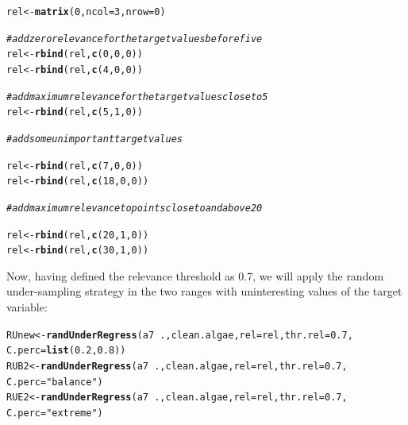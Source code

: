 \documentclass[10pt,a4paper]{article}\usepackage[]{graphicx}\usepackage[]{color}
\makeatletter
\newcommand{\hlnum}[1]{\textcolor[rgb]{0.686,0.059,0.569}{#1}}%
\newcommand{\hlstr}[1]{\textcolor[rgb]{0.192,0.494,0.8}{#1}}%
\newcommand{\hlcom}[1]{\textcolor[rgb]{0.678,0.584,0.686}{\textit{#1}}}%
\newcommand{\hlopt}[1]{\textcolor[rgb]{0,0,0}{#1}}%
\newcommand{\hlstd}[1]{\textcolor[rgb]{0.345,0.345,0.345}{#1}}%
\newcommand{\hlkwb}[1]{\textcolor[rgb]{0.69,0.353,0.396}{#1}}%
\newcommand{\hlkwc}[1]{\textcolor[rgb]{0.333,0.667,0.333}{#1}}%
\newcommand{\hlkwd}[1]{\textcolor[rgb]{0.737,0.353,0.396}{\textbf{#1}}}%
\newenvironment{kframe}{%
 \def\at@end@of@kframe{}%
 \ifinner\ifhmode%
  \def\at@end@of@kframe{\end{minipage}}%
  \begin{minipage}{\columnwidth}%
 \fi\fi%
 \def\FrameCommand##1{\hskip\@totalleftmargin \hskip-\fboxsep
 \colorbox{shadecolor}{##1}\hskip-\fboxsep
     \hskip-\linewidth \hskip-\@totalleftmargin \hskip\columnwidth}%
 \MakeFramed {\advance\hsize-\width
   \@totalleftmargin\z@ \linewidth\hsize
   \@setminipage}}%
 {\par\unskip\endMakeFramed%
 \at@end@of@kframe}
\newenvironment{knitrout}{}{} %
\makeatother
\begin{document}
\begin{knitrout}\footnotesize
{}\color{fgcolor}\begin{kframe}
\begin{alltt}
\hlstd{rel} \hlkwb{<-} \hlkwd{matrix}\hlstd{(}\hlnum{0}\hlstd{,}\hlkwc{ncol}\hlstd{=}\hlnum{3}\hlstd{,}\hlkwc{nrow}\hlstd{=}\hlnum{0}\hlstd{)}

\hlcom{# add zero relevance for the target values before five}
\hlstd{rel} \hlkwb{<-} \hlkwd{rbind}\hlstd{(rel,} \hlkwd{c}\hlstd{(}\hlnum{0}\hlstd{,}\hlnum{0}\hlstd{,}\hlnum{0}\hlstd{))}
\hlstd{rel} \hlkwb{<-} \hlkwd{rbind}\hlstd{(rel,}\hlkwd{c}\hlstd{(}\hlnum{4}\hlstd{,}\hlnum{0}\hlstd{,}\hlnum{0}\hlstd{))}

\hlcom{# add maximum relevance for the target values close to 5}
\hlstd{rel} \hlkwb{<-} \hlkwd{rbind}\hlstd{(rel,} \hlkwd{c}\hlstd{(}\hlnum{5}\hlstd{,}\hlnum{1}\hlstd{,}\hlnum{0}\hlstd{))}

\hlcom{# add some unimportant target values }

\hlstd{rel} \hlkwb{<-} \hlkwd{rbind}\hlstd{(rel,} \hlkwd{c}\hlstd{(}\hlnum{7}\hlstd{,}\hlnum{0}\hlstd{,}\hlnum{0}\hlstd{))}
\hlstd{rel} \hlkwb{<-} \hlkwd{rbind}\hlstd{(rel,} \hlkwd{c}\hlstd{(}\hlnum{18}\hlstd{,}\hlnum{0}\hlstd{,}\hlnum{0}\hlstd{))}

\hlcom{# add maximum relevance to points close to and above 20}

\hlstd{rel} \hlkwb{<-} \hlkwd{rbind}\hlstd{(rel,} \hlkwd{c}\hlstd{(}\hlnum{20}\hlstd{,}\hlnum{1}\hlstd{,}\hlnum{0}\hlstd{))}
\hlstd{rel} \hlkwb{<-} \hlkwd{rbind}\hlstd{(rel,} \hlkwd{c}\hlstd{(}\hlnum{30}\hlstd{,}\hlnum{1}\hlstd{,}\hlnum{0}\hlstd{))}
\end{alltt}
\end{kframe}
\end{knitrout}

Now, having defined the relevance threshold as 0.7, we will apply the random under-sampling strategy in the two ranges with uninteresting values of the target variable:

\begin{knitrout}\footnotesize
{}\color{fgcolor}\begin{kframe}
\begin{alltt}
\hlstd{RUnew} \hlkwb{<-} \hlkwd{randUnderRegress}\hlstd{(a7}\hlopt{~}\hlstd{., clean.algae,} \hlkwc{rel}\hlstd{=rel,} \hlkwc{thr.rel}\hlstd{=}\hlnum{0.7}\hlstd{,}
                          \hlkwc{C.perc}\hlstd{=}\hlkwd{list}\hlstd{(}\hlnum{0.2}\hlstd{,}\hlnum{0.8}\hlstd{))}
\hlstd{RUB2} \hlkwb{<-} \hlkwd{randUnderRegress}\hlstd{(a7}\hlopt{~}\hlstd{., clean.algae,} \hlkwc{rel}\hlstd{=rel,} \hlkwc{thr.rel}\hlstd{=}\hlnum{0.7}\hlstd{,}
                         \hlkwc{C.perc}\hlstd{=}\hlstr{"balance"}\hlstd{)}
\hlstd{RUE2} \hlkwb{<-} \hlkwd{randUnderRegress}\hlstd{(a7}\hlopt{~}\hlstd{., clean.algae,} \hlkwc{rel}\hlstd{=rel,} \hlkwc{thr.rel}\hlstd{=}\hlnum{0.7}\hlstd{,}
                         \hlkwc{C.perc}\hlstd{=}\hlstr{"extreme"}\hlstd{)}
\end{alltt}
\end{kframe}
\end{knitrout}
\end{document}
